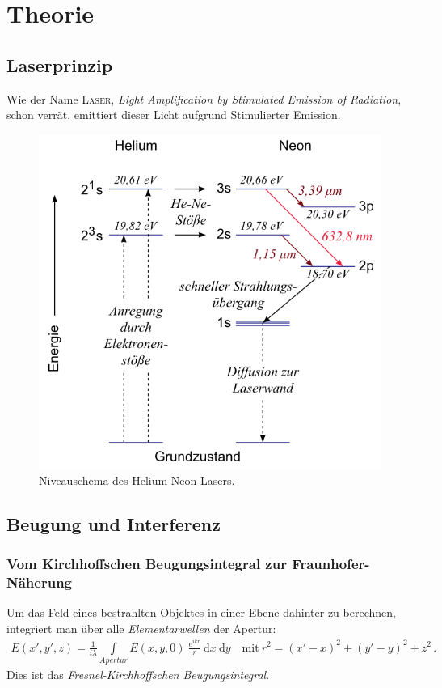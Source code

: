 \documentclass[12pt,a4paper,titlepage,headinclude,bibtotoc]{scrartcl}
\newcommand{\dif}{\ensuremath{\mathrm{d}}}
\begin{document}
\section{Theorie}
\label{sec:theorie}
\subsection{Laserprinzip}
Wie der Name \textsc{Laser}, \textit{Light Amplification by Stimulated Emission of Radiation}, schon verrät, emittiert dieser Licht aufgrund Stimulierter Emission.
\begin{figure}[!h]
	\centering
	\includegraphics[scale=0.6]{NiveauHeNe.png}
	\caption{Niveauschema des Helium-Neon-Lasers. \cite[Datum: 02.01.15]{LP21}}
\end{figure}


\subsection{Beugung und Interferenz}

\subsubsection{Vom Kirchhoffschen Beugungsintegral zur Fraunhofer-Näherung}
Um das Feld eines bestrahlten Objektes in einer Ebene dahinter zu berechnen, integriert man über alle \emph{Elementarwellen} der Apertur:
\begin{align}
	E(x',y',z)=\frac{1}{i \lambda} \int \limits _{Apertur} E(x,y,0) ~ \frac{e^{ikr}}{r}~\dif x ~\dif y \quad \text{mit} ~ r^2=(x'-x)^2+(y'-y)^2+z^2 \,.
	\label{eq:Beugungsintegral}
\end{align}
Dies ist das \emph{Fresnel-Kirchhoffschen Beugungsintegral}.\\
\end{document}
